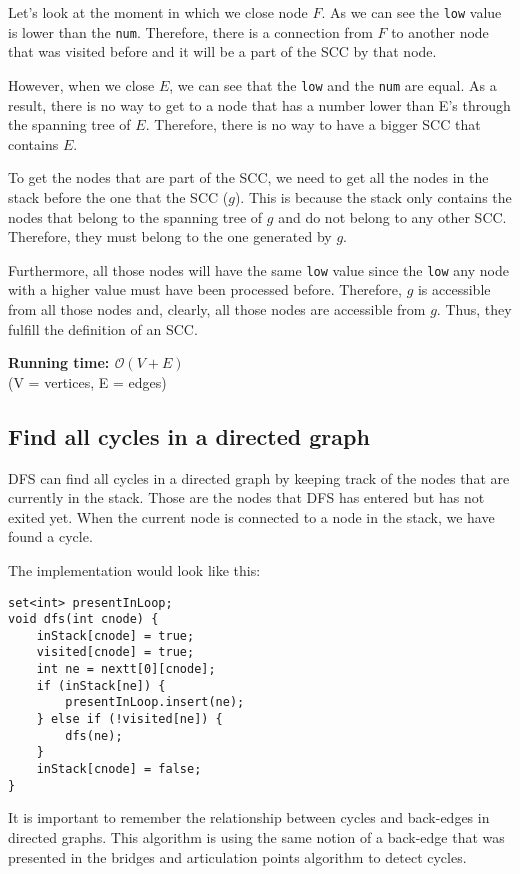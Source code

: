 Let's look  at the moment in which we close node $F$. As we can see the \texttt{low}
value is lower than the \texttt{num}. Therefore, there is a connection from $F$ to
another node that was visited before and it will be a part of the SCC 
by that node.

However, when we close $E$, we can see that the \texttt{low} and the \texttt{num}
are equal. As a result, there is no way to get to a node that has a number lower than
E's through the spanning tree of $E$. Therefore, there is no way to have a bigger 
SCC that contains $E$.

To get the nodes that are part of the SCC, we need to get all the nodes in the stack before
the one that  the SCC ($g$). This is because the stack only contains the 
nodes that belong to the spanning tree of $g$ and do not belong to any other SCC. 
Therefore, they must belong to the one generated by $g$. 

Furthermore, all those nodes will have the same \texttt{low} value since the \texttt{low}
any node with a higher value must have been processed before. Therefore, $g$ is accessible
from all those nodes and, clearly, all those nodes are accessible from $g$.
Thus, they fulfill the definition of an SCC.



\newpage
{}
\noindent \textbf{\boldmath Running time: $\mathcal{O}(V+E)$}
\\ {\small (V = vertices, E = edges)}

\subsection{Find all cycles in a directed graph }
DFS can find all cycles in a directed graph by keeping track of the nodes that 
are currently in the stack. Those are the nodes that DFS has entered but 
has not exited yet. When the current node is connected to a node
in the stack, we have found a cycle.

The implementation would look like this:
\begin{verbatim}
set<int> presentInLoop;
void dfs(int cnode) {
    inStack[cnode] = true;
    visited[cnode] = true;
    int ne = nextt[0][cnode];
    if (inStack[ne]) {
        presentInLoop.insert(ne);
    } else if (!visited[ne]) {
        dfs(ne);
    }
    inStack[cnode] = false;
}
\end{verbatim}

It is important to remember the relationship between cycles and back-edges in 
directed graphs. This algorithm is using the same notion of a back-edge that 
was presented in the bridges and articulation points algorithm to
detect cycles.



